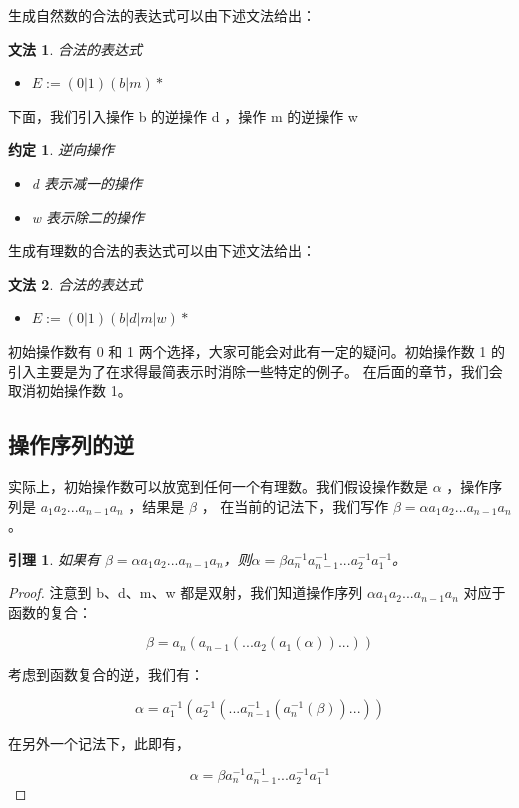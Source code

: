 \documentclass[a4paper,12pt]{article}
\newtheorem{lemma}{引理}
\newtheorem{grammar}{文法}
\newtheorem{convention}{约定}
\begin{document}
生成自然数的合法的表达式可以由下述文法给出：

\begin{grammar}
\label{g1}
合法的表达式
\begin{itemize}
\item $E := (0 | 1)(b | m)*$
\end{itemize}
\end{grammar}

下面，我们引入操作 b 的逆操作 d ，操作 m 的逆操作 w

\begin{convention}
逆向操作
\begin{itemize}
\item d 表示减一的操作
\item w 表示除二的操作
\end{itemize}
\end{convention}

生成有理数的合法的表达式可以由下述文法给出：

\begin{grammar}
\label{g2}
合法的表达式
\begin{itemize}
\item $E := (0 | 1)(b | d | m | w)*$
\end{itemize}
\end{grammar}

初始操作数有 0 和 1 两个选择，大家可能会对此有一定的疑问。初始操作数 1 的引入主要是为了在求得最简表示时消除一些特定的例子。
在后面的章节，我们会取消初始操作数 1。


\subsection{操作序列的逆}

实际上，初始操作数可以放宽到任何一个有理数。我们假设操作数是 $\alpha$ ，操作序列是 $a_1 a_2 ... a_{n-1} a_n$ ，结果是 $\beta$ ，
在当前的记法下，我们写作 $\beta = \alpha a_1 a_2 ... a_{n-1} a_n$。

\begin{lemma}
\label{l1}
如果有 $\beta = \alpha a_1 a_2 ... a_{n-1} a_n$，则$\alpha = \beta a_n^{-1} a_{n-1}^{-1} ... a_2^{-1} a_1^{-1}$。
\end{lemma}

\begin{proof}
注意到 b、d、m、w 都是双射，我们知道操作序列 $\alpha a_1 a_2 ... a_{n-1} a_n$ 对应于函数的复合：

$$\beta = a_n( a_{n-1}( ... a_2( a_1(\alpha) ) ... ) )$$

考虑到函数复合的逆，我们有：

$$\alpha = a_1^{-1}( a_2^{-1}( ... a_{n-1}^{-1}( a_n^{-1}(\beta) ) ... ) )$$

在另外一个记法下，此即有，

$$\alpha = \beta a_n^{-1} a_{n-1}^{-1} ... a_2^{-1} a_1^{-1}$$

\qedhere

\end{proof}
\end{document}
